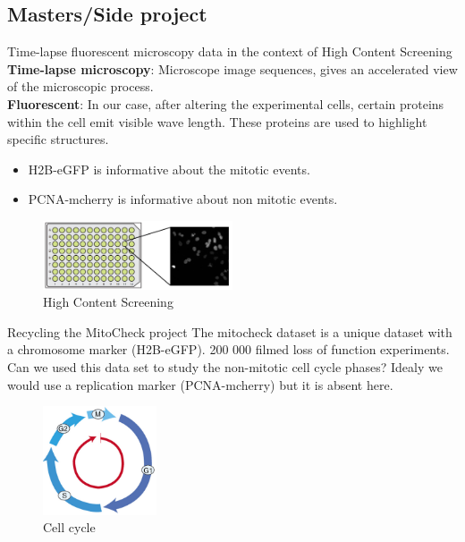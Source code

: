 \documentclass{beamer}
\begin{document}
\subsection{Masters/Side project}
\begin{frame}{Time-lapse fluorescent microscopy data in the context of High Content Screening}
\textbf{Time-lapse microscopy}: Microscope image sequences, gives an accelerated view of the microscopic process. \\
\textbf{Fluorescent}:  In our case, after altering the experimental cells, certain proteins within the cell emit visible wave length. These proteins are used to highlight specific structures.
\begin{itemize}
\item H2B-eGFP is informative about the mitotic events.
\item PCNA-mcherry is informative about non mitotic events.
\end{itemize}
\begin{figure}
\centering
\includegraphics[width=0.5\textwidth]{Images/plate_well.png}
\caption{High Content Screening}
\end{figure}
\end{frame}

\begin{frame}{Recycling the MitoCheck project}
The mitocheck dataset is a unique dataset with a chromosome marker (H2B-eGFP). 200 000 filmed loss of function experiments. Can we used this data set to study the non-mitotic cell cycle phases? Idealy we would use a replication marker (PCNA-mcherry) but it is absent here.
\begin{figure}[!ht]
\centering
\includegraphics[width=0.3\textwidth]{Images/somaticcellcycle3.png}
\caption{Cell cycle}
\label{cellcycle}
\end{figure}
\end{frame}
\end{document}
